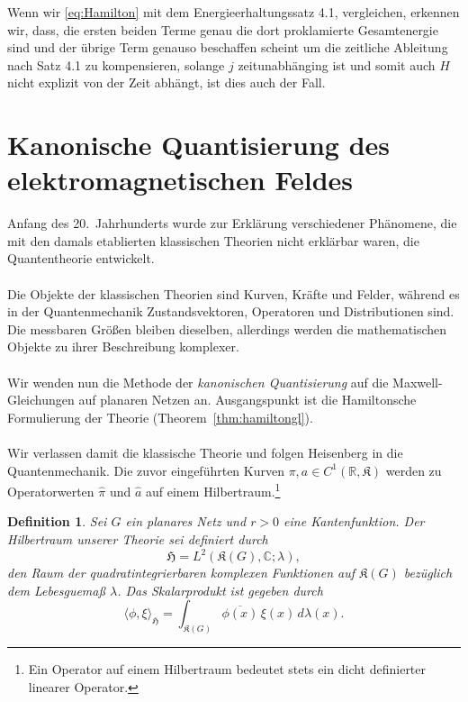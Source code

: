 \documentclass[11pt,a4paper,leqno]{report}
\newtheorem{definition}[theorem]{Definition}
\numberwithin{equation}{chapter}
\begin{document}
\noindent
Wenn wir \eqref{eq:Hamilton} mit dem Energieerhaltungssatz 4.1, vergleichen, erkennen wir, dass, die ersten beiden Terme genau die dort proklamierte Gesamtenergie sind und der \"ubrige Term genauso beschaffen scheint um die zeitliche Ableitung nach Satz 4.1 zu kompensieren, solange $j$ zeitunabh\"anging ist und somit auch $H$ nicht explizit von der Zeit abh\"angt, ist dies auch der Fall.
\section{Kanonische Quantisierung des elektromagnetischen Feldes}
Anfang des 20.~Jahrhunderts wurde zur Erklärung verschiedener Phänomene, die mit den damals etablierten klassischen Theorien nicht erklärbar waren, die Quantentheorie entwickelt.\\
\\
Die Objekte der klassischen Theorien sind Kurven, Kräfte und Felder, während es in der Quantenmechanik Zustandsvektoren, Operatoren und Distributionen sind. Die messbaren Größen bleiben dieselben, allerdings werden die mathematischen Objekte zu ihrer Beschreibung komplexer.\\
\\
Wir wenden nun die Methode der \emph{kanonischen Quantisierung} auf die Maxwell-Gleichungen auf planaren Netzen an. Ausgangspunkt ist die Hamiltonsche Formulierung der Theorie (Theorem~\ref{thm:hamiltongl}).\\
\\
Wir verlassen damit die klassische Theorie und folgen Heisenberg in die Quantenmechanik. 
Die zuvor eingeführten Kurven \( \pi, a \in C^1(\mathbb{R},\mathfrak{K}) \) werden zu Operatorwerten 
\(\hat{\pi}\) und \(\hat{a}\) auf einem Hilbertraum.\footnote{Ein Operator auf einem Hilbertraum bedeutet stets ein dicht definierter linearer Operator.}
\begin{definition}
	Sei \( G \) ein planares Netz und \(r>0\) eine Kantenfunktion. 
	Der Hilbertraum unserer Theorie sei definiert durch
	\[
	\mathfrak{H} = L^2(\mathfrak{K}(G), \mathbb{C}; \lambda),
	\]
	den Raum der quadratintegrierbaren komplexen Funktionen auf \(\mathfrak{K}(G)\) 
	bezüglich dem Lebesguemaß $\lambda$.
	Das Skalarprodukt ist gegeben durch
	\[
	\langle \phi, \xi \rangle_{\mathfrak{H}} = \int_{\mathfrak{K}(G)} 
	\overline{\phi(x)}\, \xi(x)\, d\lambda(x).
	\]
\end{definition}
\noindent
\end{document}
